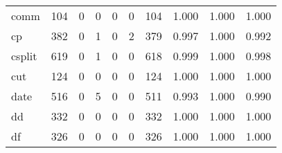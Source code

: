 \begin{longtable}{lp{1.3cm}p{1.3cm}p{1.3cm}p{1.3cm}p{1.3cm}p{1.3cm}p{1.3cm}p{1.3cm}p{1.3cm}}
comm      &                    104 &                                             0 &                                            0 &                                           0 &                                            0 &                                        104 &                                1.000 &                                  1.000 &                                1.000 \\
cp        &                    382 &                                             0 &                                            1 &                                           0 &                                            2 &                                        379 &                                0.997 &                                  1.000 &                                0.992 \\
csplit    &                    619 &                                             0 &                                            1 &                                           0 &                                            0 &                                        618 &                                0.999 &                                  1.000 &                                0.998 \\
cut       &                    124 &                                             0 &                                            0 &                                           0 &                                            0 &                                        124 &                                1.000 &                                  1.000 &                                1.000 \\
date      &                    516 &                                             0 &                                            5 &                                           0 &                                            0 &                                        511 &                                0.993 &                                  1.000 &                                0.990 \\
dd        &                    332 &                                             0 &                                            0 &                                           0 &                                            0 &                                        332 &                                1.000 &                                  1.000 &                                1.000 \\
df        &                    326 &                                             0 &                                            0 &                                           0 &                                            0 &                                        326 &                                1.000 &                                  1.000 &                                1.000 \\

\end{longtable}
